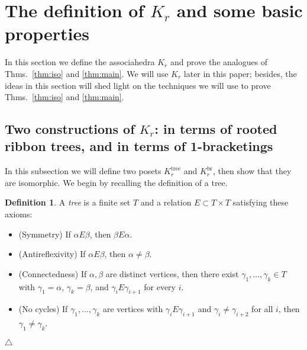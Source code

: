 \documentclass[11pt]{amsart}
\theoremstyle{definition}
\newtheorem{definition}[theorem]{Definition}
\theoremstyle{remark}
\theoremstyle{plain}
\newcommand{\on}{\operatorname}
\newcommand{\tree}{{\on{tree}}}
\newcommand{\br}{{\on{br}}}
\begin{document}
\section{The definition of \texorpdfstring{$K_r$}{Kr} and some basic properties}
\label{sec:ass}

In this section we define the associahedra $K_r$ and prove the analogues of Thms.~\ref{thm:iso} and \ref{thm:main}.
We will use $K_r$ later in this paper; besides, the ideas in this section will shed light on the techniques we will use to prove Thms.~\ref{thm:iso} and \ref{thm:main}. 

\subsection{Two constructions of \texorpdfstring{$K_r$}{Kr}: in terms of rooted ribbon trees, and in terms of 1-bracketings}
\label{ss:Kr_construction}

In this subsection we will define two posets $K_r^\tree$ and $K_r^\br$, then show that they are isomorphic.
We begin by recalling the definition of a tree.

\begin{definition}
A \emph{tree} is a finite set $T$ and a relation $E \subset T \times T$ satisfying these axioms:

\begin{itemize}
\item[] ({\sc Symmetry}) If $\alpha E \beta$, then $\beta E \alpha$.

\item[] ({\sc Antireflexivity}) If $\alpha E \beta$, then $\alpha \neq \beta$.

\item[] ({\sc Connectedness}) If $\alpha, \beta$ are distinct vertices, then there exist $\gamma_1, \ldots, \gamma_k \in T$ with $\gamma_1 = \alpha$, $\gamma_k = \beta$, and $\gamma_i E \gamma_{i+1}$ for every $i$.

\item[] ({\sc No cycles}) If $\gamma_1, \ldots, \gamma_k$ are vertices with $\gamma_i E \gamma_{i+1}$ and $\gamma_i \neq \gamma_{i+2}$ for all $i$, then $\gamma_1 \neq \gamma_k$.
\end{itemize}
\null\hfill$\triangle$
\end{definition}
\end{document}
